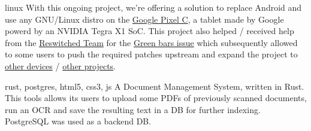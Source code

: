 \begin{CV}

    {}
    {linux}
    {With this ongoing project, we're offering a solution to replace Android and use any GNU/Linux distro 
    on the \href{https://en.wikipedia.org/wiki/Pixel_C}{Google Pixel C}, a tablet made by Google powerd by an NVIDIA Tegra X1 SoC.
    This project also helped / received help from the \href{https://reswitched.team/}{Reswitched Team} for the 
    \href{https://github.com/denysvitali/linux-on-pixel-c/issues/1}{Green bars issue} which subsequently allowed to
    some users to push the required patches upstream and expand the project to 
    \href{https://github.com/fail0verflow/switch-linux}{other devices} / 
    \href{https://github.com/postmarketOS/pmbootstrap/pull/1534}{other projects}.}


    

    {}
    {rust, postgres, html5, css3, js}
    {A Document Management System, written in Rust. This tools allows its users to upload some PDFs of previously
    scanned documents, run an OCR and save the resulting text in a DB for further indexing. PostgreSQL was used as a
    backend DB.}


\end{CV}
